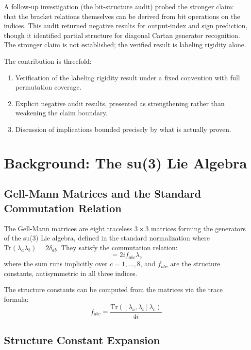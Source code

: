 \documentclass[11pt,a4paper]{article}
\begin{document}
A follow-up investigation (the bit-structure audit) probed the stronger claim: that the bracket relations themselves can be derived from bit operations on the indices. This audit returned negative results for output-index and sign prediction, though it identified partial structure for diagonal Cartan generator recognition. The stronger claim is not established; the verified result is labeling rigidity alone.

The contribution is threefold:
\begin{enumerate}
  \item Verification of the labeling rigidity result under a fixed convention with full permutation coverage.
  \item Explicit negative audit results, presented as strengthening rather than weakening the claim boundary.
  \item Discussion of implications bounded precisely by what is actually proven.
\end{enumerate}

\section{Background: The su(3) Lie Algebra}

\subsection{Gell-Mann Matrices and the Standard Commutation Relation}

The Gell-Mann matrices are eight traceless $3 \times 3$ matrices forming the generators of the su(3) Lie algebra, defined in the standard normalization where $\text{Tr}(\lambda_a \lambda_b) = 2 \delta_{ab}$. They satisfy the commutation relation:
\begin{equation}
[\lambda_a, \lambda_b] = 2i f_{abc} \lambda_c
\end{equation}
where the sum runs implicitly over $c = 1, \ldots, 8$, and $f_{abc}$ are the structure constants, antisymmetric in all three indices.

The structure constants can be computed from the matrices via the trace formula:
\begin{equation}
f_{abc} = \frac{\text{Tr}([\lambda_a, \lambda_b] \lambda_c)}{4i}
\end{equation}

\subsection{Structure Constant Expansion}
\end{document}
